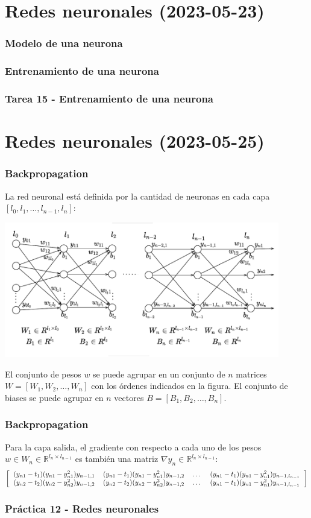 \section{Redes neuronales (2023-05-23)}

\begin{frame}\frametitle{Modelo de una neurona}
\end{frame}

\begin{frame}\frametitle{Entrenamiento de una neurona}
\end{frame}

\begin{frame}\frametitle{Tarea 15 - Entrenamiento de una neurona}
\end{frame}

\section{Redes neuronales (2023-05-25)}

\begin{frame}\frametitle{Backpropagation}
  La red neuronal está definida por la cantidad de neuronas en cada capa $[l_0, l_1, \dots, l_{n-1}, l_n]$:
  
  \includegraphics[width=0.9\textwidth]{Figures/NeuralNetworks1.pdf}
  
  El conjunto de pesos $w$ se puede agrupar en un conjunto de $n$ matrices $W=[W_1, W_2, \dots , W_n]$ con los órdenes indicados en la figura. El conjunto de biases se puede agrupar en $n$ vectores $B=[B_1, B_2, \dots, B_n]$. 
\end{frame}

\begin{frame}\frametitle{Backpropagation}
  Para la capa salida, el gradiente  con respecto a cada uno de los pesos $w\in W_n\in\mathbb{R}^{l_n\times l_{n-1}}$ es también una matriz $\nabla y_n \in \mathbb{R}^{l_n\times l_{n-1}}$:
  \[\left[\begin{tabular}{cccc}
      $(y_{n1} - t_1)(y_{n1}-y_{n1}^2)y_{n-1,1}$ & $(y_{n1} - t_1)(y_{n1}-y_{n1}^2)y_{n-1,2}$ & \dots & $(y_{n1} - t_1)(y_{n1}-y_{n1}^2)y_{n-1,l_{n-1}}$ \\
      $(y_{n2} - t_2)(y_{n2}-y_{n2}^2)y_{n-1,2}$ & $(y_{n2} - t_2)(y_{n2}-y_{n2}^2)y_{n-1,2}$ & \dots & $(y_{n1} - t_1)(y_{n1}-y_{n1}^2)y_{n-1,l_{n-1}}$ \\
  \end{tabular}\right]\]
\end{frame}

\begin{frame}\frametitle{Práctica 12 - Redes neuronales}
\end{frame}